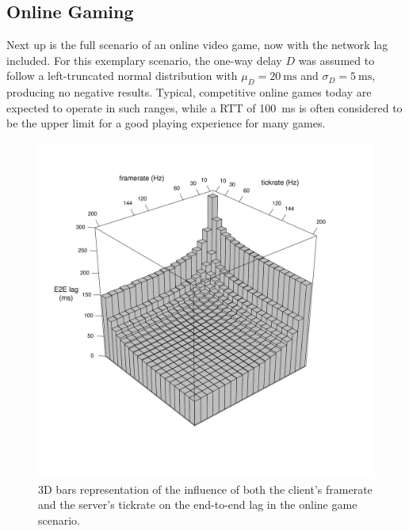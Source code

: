 \subsection{Online Gaming}

Next up is the full scenario of an online video game, now with the network lag included. For this exemplary scenario, the one-way delay $D$ was assumed to follow a left-truncated normal distribution with $\mu_D = \SI{20}{\milli\second}$ and $\sigma_D = \SI{5}{\milli\second}$, producing no negative results. Typical, competitive online games today are expected to operate in such ranges, while a \acrshort{RTT} of \SI{100}{\milli\second} is often considered to be the upper limit for a good playing experience for many games.

\begin{figure}[!t]
	\centering
	\vspace{-6mm}
	\includegraphics[width=1.0\columnwidth]{../simulation/visualization/e2e-lag-3dbars.pdf}
	\vspace{-15mm}
	\caption{3D bars representation of the influence of both the client's framerate and the server's tickrate on the end-to-end lag in the online game scenario.}
\label{fig:3dbars-framerate-tickrate-lag}
\end{figure}

